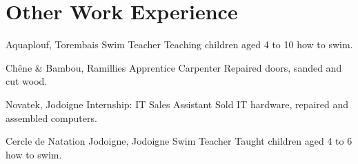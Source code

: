 \documentclass[%
    doublesided,
    paper=a4,
    fontsize=10pt,
    hidelinks
]{my-resume}
\begin{document}
{        \section{Other Work Experience}
        {Aquaplouf, Torembais}
        {Swim Teacher}
        {Teaching children aged 4 to 10 how to swim.}

        {Chêne \& Bambou, Ramillies}
        {Apprentice Carpenter}
        {Repaired doors, sanded and cut wood.}

        {Novatek, Jodoigne}
        {Internship: IT Sales Assistant}
        {Sold IT hardware, repaired and assembled computers.}

        {Cercle de Natation Jodoigne, Jodoigne}
        {Swim Teacher}
        {Taught children aged 4 to 6 how to swim.}
    }

    \makebody
\end{document}
